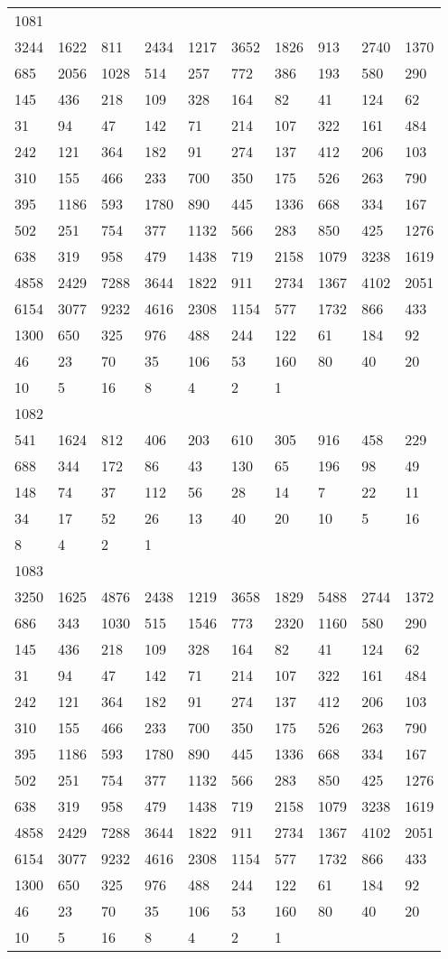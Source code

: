 \begin{longtable}{*{10}{l}}
1081&&&&&&&&&\\
3244& 1622& 811& 2434& 1217& 3652& 1826& 913& 2740& 1370\\
685& 2056& 1028& 514& 257& 772& 386& 193& 580& 290\\
145& 436& 218& 109& 328& 164& 82& 41& 124& 62\\
31& 94& 47& 142& 71& 214& 107& 322& 161& 484\\
242& 121& 364& 182& 91& 274& 137& 412& 206& 103\\
310& 155& 466& 233& 700& 350& 175& 526& 263& 790\\
395& 1186& 593& 1780& 890& 445& 1336& 668& 334& 167\\
502& 251& 754& 377& 1132& 566& 283& 850& 425& 1276\\
638& 319& 958& 479& 1438& 719& 2158& 1079& 3238& 1619\\
4858& 2429& 7288& 3644& 1822& 911& 2734& 1367& 4102& 2051\\
6154& 3077& 9232& 4616& 2308& 1154& 577& 1732& 866& 433\\
1300& 650& 325& 976& 488& 244& 122& 61& 184& 92\\
46& 23& 70& 35& 106& 53& 160& 80& 40& 20\\
10& 5& 16& 8& 4& 2& 1& \\

1082&&&&&&&&&\\
541& 1624& 812& 406& 203& 610& 305& 916& 458& 229\\
688& 344& 172& 86& 43& 130& 65& 196& 98& 49\\
148& 74& 37& 112& 56& 28& 14& 7& 22& 11\\
34& 17& 52& 26& 13& 40& 20& 10& 5& 16\\
8& 4& 2& 1& \\

1083&&&&&&&&&\\
3250& 1625& 4876& 2438& 1219& 3658& 1829& 5488& 2744& 1372\\
686& 343& 1030& 515& 1546& 773& 2320& 1160& 580& 290\\
145& 436& 218& 109& 328& 164& 82& 41& 124& 62\\
31& 94& 47& 142& 71& 214& 107& 322& 161& 484\\
242& 121& 364& 182& 91& 274& 137& 412& 206& 103\\
310& 155& 466& 233& 700& 350& 175& 526& 263& 790\\
395& 1186& 593& 1780& 890& 445& 1336& 668& 334& 167\\
502& 251& 754& 377& 1132& 566& 283& 850& 425& 1276\\
638& 319& 958& 479& 1438& 719& 2158& 1079& 3238& 1619\\
4858& 2429& 7288& 3644& 1822& 911& 2734& 1367& 4102& 2051\\
6154& 3077& 9232& 4616& 2308& 1154& 577& 1732& 866& 433\\
1300& 650& 325& 976& 488& 244& 122& 61& 184& 92\\
46& 23& 70& 35& 106& 53& 160& 80& 40& 20\\
10& 5& 16& 8& 4& 2& 1& \\


\end{longtable}
